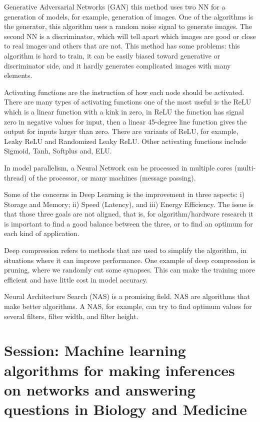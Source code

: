 \documentclass[9pt,a4paper]{article}
\begin{document}
Generative Adversarial Networks (GAN) this method uses two NN for a generation of models, for example, generation of images. One of the algorithms is the generator, this algorithm uses a random noise signal to generate images. The second NN is a discriminator, which will tell apart which images are good or close to real images and others that are not. This method has some problems: this algorithm is hard to train, it can be easily biased toward generative or discriminator side, and it hardly generates complicated images with many elements.


Activating functions are the instruction of how each node should be activated. 
There are many types of activating functions one of the most useful is the ReLU which is a linear function with a kink in zero, in ReLU the function has signal zero in negative values for input, then a linear 45-degree line function gives the output for inputs larger than zero. There are variants of ReLU, for example, Leaky ReLU and Randomized Leaky ReLU. Other activating functions include Sigmoid, Tanh, Softplus and, ELU.

In model parallelism, a Neural Network can be processed in multiple cores (multi-thread) of the processor, or many machines (message passing). 

Some of the concerns in Deep Learning is the improvement in three aspects: i) Storage and Memory; ii) Speed (Latency), and iii) Energy Efficiency. 
The issue is that those three goals are not aligned, that is, for algorithm/hardware research it is important to find a good balance between the three, or to find an optimum for each kind of application.

Deep compression refers to methods that are used to simplify the algorithm, in situations where it can improve performance. One example of deep compression is pruning, where we randomly cut some synapses. This can make the training more efficient and have little cost in model accuracy.


Neural Architecture Search (NAS) is a promising field. NAS are algorithms that make better algorithms. A NAS, for example, can try to find optimum values for several filters, filter width, and filter height.

\section*{Session: Machine learning  algorithms for making  inferences on networks and answering questions in Biology and Medicine}
\end{document}
